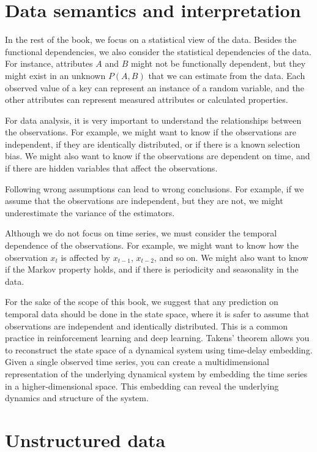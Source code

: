 \section{Data semantics and interpretation}

In the rest of the book, we focus on a statistical view of the data.  Besides the
functional dependencies, we also consider the statistical dependencies of the data.  For
instance, attributes $A$ and $B$ might not be functionally dependent, but they might exist
in an unknown $P(A, B)$ that we can estimate from the data.  Each observed value of a key can
represent an instance of a random variable, and the other attributes can represent
measured attributes or calculated properties.

For data analysis, it is very important to understand the relationships between the
observations.  For example, we might want to know if the observations are independent, if
they are identically distributed, or if there is a known selection bias.  We might also
want to know if the observations are dependent on time, and if there are hidden variables
that affect the observations.

Following wrong assumptions can lead to wrong conclusions.  For example, if we assume that
the observations are independent, but they are not, we might underestimate the variance of
the estimators.

Although we do not focus on time series, we must consider the temporal dependence of the
observations.  For example, we might want to know how the observation $x_t$ is affected by
$x_{t-1}$, $x_{t-2}$, and so on.  We might also want to know if the Markov property holds,
and if there is periodicity and seasonality in the data.

For the sake of the scope of this book, we suggest that any prediction on temporal data
should be done in the state space, where it is safer to assume that observations are
independent and identically distributed.  This is a common practice in reinforcement
learning and deep learning. Takens' theorem allows you to
reconstruct the state space of a dynamical system using time-delay embedding. Given a
single observed time series, you can create a multidimensional representation of the
underlying dynamical system by embedding the time series in a higher-dimensional space.
This embedding can reveal the underlying dynamics and structure of the system.

\section{Unstructured data}

